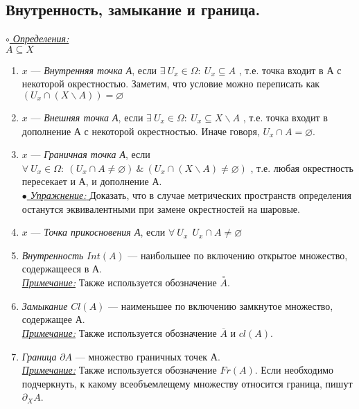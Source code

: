 \documentclass[10pt]{report}
\begin{document}
\begin{spacing}{1.5}
\section{Внутренность, замыкание и граница.}
\underline{\textit{$\circ$ Определения:}}\\
$A\subseteq X$
\begin{enumerate}
\item $x$ --- \emph{Внутренняя точка А}, если $\exists ~U_{x}\in\Omega:~U_{x}\subseteq A$ , т.е. точка входит в А с некоторой окрестностью. Заметим, что условие можно переписать как $(U_{x}\cap(X\backslash A))=\varnothing$
\item $x$ --- \emph{Внешняя точка А}, если $\exists ~U_{x}\in\Omega:~U_{x}\subseteq X\backslash A$ , т.е. точка входит в дополнение А с некоторой окрестностью. Иначе говоря, $U_{x}\cap A=\varnothing$.
\item $x$ --- \emph{Граничная точка А}, если $\forall ~U_{x}\in\Omega:~(U_{x}\cap A\neq\varnothing) ~\& ~ (U_{x}\cap(X\backslash A)\neq\varnothing)$ , т.е. любая окрестность пересекает и А, и дополнение А.
\\ \underline{\emph{$\bullet$ Упражнение: }} Доказать, что в случае метрических пространств определения останутся эквивалентными при замене окрестностей на шаровые.
\item $x$ --- \emph{Точка прикосновения А}, если $\forall~U_{x}~~U_{x}\cap A\neq \varnothing$
\item \emph{Внутренность} $Int(A)$ --- наибольшее по включению открытое множество, содержащееся в А.
\\ \underline{\emph{Примечание:}} Также используется обозначение $\overset{\circ}{A}$.
\item \emph{Замыкание} $Cl(A)$ --- наименьшее по включению замкнутое множество, содержащее А.
\\ \underline{\emph{Примечание:}} Также используется обозначение $\overline{A}$ и $cl(A)$.
\item \emph{Граница} $\partial A$ --- множество граничных точек А. 
\\ \underline{\emph{Примечание:}} Также используется обозначение $Fr(A)$. Если необходимо подчеркнуть, к какому всеобъемлещему множеству относится граница, пишут $\partial_{X}A$.
\end{enumerate}

\end{spacing}
\end{document}
